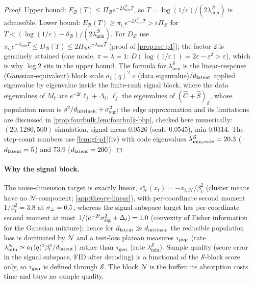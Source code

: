 \begin{proof}
Upper bound: $E_{\mathcal B}(T)\le\Pi_{\mathcal B}e^{-2\lambda^{\mathcal B}_{\min}T}$, so $T=\log(1/\varepsilon)/(2\lambda^{\mathcal B}_{\min})$ is admissible. Lower bound: $E_{\mathcal B}(T)\ge\pi_{i_\circ}e^{-2\lambda^{\mathcal B}_{\min}T}>\varepsilon\Pi_{\mathcal B}$ for $T<(\log(1/\varepsilon)-\theta_{\mathcal B})/(2\lambda^{\mathcal B}_{\min})$. For $D_{\mathcal B}$ use $\pi_{i_\circ}e^{-\lambda_{\min}T}\le D_{\mathcal B}(T)\le2\Pi_{\mathcal B}e^{-\lambda_{\min}T}$ (proof of \cref{prop:rse-p1}); the factor $2$ is genuinely attained (one mode, $\pi=\lambda=1$: $D(\log(1/\varepsilon))=2\varepsilon-\varepsilon^2>\varepsilon$), which is why $\log2$ sits in the upper bound. The formula for $\lambda^{\mathcal S}_{\min}$ is the linear-response (Gaussian-equivalent) block scale $a_1(q)^2\times$(data eigenvalue)$/d_{\mathrm{latent}}$ applied eigenvalue by eigenvalue inside the finite-rank signal block, where the data eigenvalues of $M_t$ are $e^{-2t}\ell_j+\Delta_t$, $\ell_j$ the eigenvalues of $(\hat C+\hat S)_{\mathcal S}$, whose population mean is $s^2/d_{\mathrm{intrinsic}}+\sigma_{\mathrm{sig}}^2$; the edge approximation and its limitations are discussed in \cref{prop:fourbulk,lem:fourbulk-bbp}, checked here numerically: $(20,1280,500)$ simulation, signal mean $0.0526$ (scale $0.0545$), min $0.0314$. The step-count numbers use \cref{lem:gf-p1}(iv) with code eigenvalues $\lambda^{\mathcal S}_{\min,\rm code}=20.3$ ($d_{\mathrm{latent}}=5$) and $73.9$ ($d_{\mathrm{latent}}=200$).
\end{proof}

\paragraph{Why the signal block.}
The noise-dimension target is exactly linear, $s^\star_{\mathcal N}(x_t)=-x_{t,\mathcal N}/\beta_t^2$ (cluster means have no $\mathcal N$-component; \cref{app:theory-linear}), with per-coordinate second moment $1/\beta_t^2=3.8$ at $\sigma_{\perp}=0.5$, whereas the signal-subspace target has per-coordinate second moment at most $1/(e^{-2t}\sigma_{\mathrm{sig}}^2+\Delta_t)=1.0$ (convexity of Fisher information for the Gaussian mixture); hence for $d_{\mathrm{latent}}\gg d_{\mathrm{intrinsic}}$ the reducible population loss is dominated by $\mathcal N$ and a test-loss plateau measures $\tau_{\rm pop}$ (rate $\lambda^{\mathcal N}_{\min}\simeq a_1(q)^2\beta_t^2/d_{\mathrm{latent}}$) rather than $\tau_{\mathrm{gen}}$ (rate $\lambda^{\mathcal S}_{\min}$). Sample quality (score error in the signal subspace, FID after decoding) is a functional of the $\mathcal S$-block score only, so $\tau_{\mathrm{gen}}$ is defined through $\mathcal S$. The block $\mathcal N$ is the buffer: its absorption costs time and buys no sample quality.

